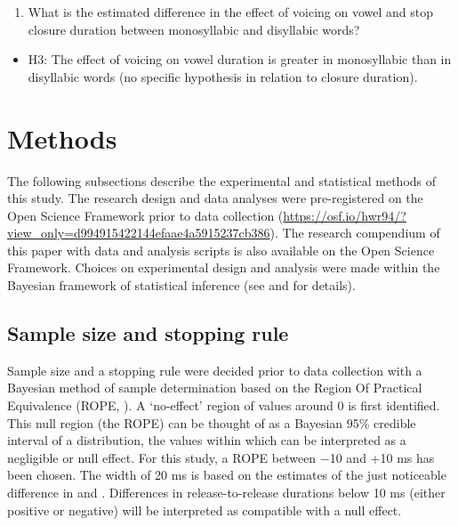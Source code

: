 \documentclass[
  12pt,
  a4paper,
]{article}
\providecommand{\tightlist}{%
  \setlength{\itemsep}{0pt}\setlength{\parskip}{0pt}}
\begin{document}
\begin{enumerate}
\def\labelenumi{\arabic{enumi}.}
\setcounter{enumi}{2}
\tightlist
\item
  What is the estimated difference in the effect of voicing on vowel and
  stop closure duration between monosyllabic and disyllabic words?
\end{enumerate}

\begin{itemize}
\tightlist
\item
  H3: The effect of voicing on vowel duration is greater in monosyllabic
  than in disyllabic words (no specific hypothesis in relation to
  closure duration).
\end{itemize}

\hypertarget{methods}{%
\section{Methods}\label{methods}}

The following subsections describe the experimental and statistical
methods of this study. The research design and data analyses were
pre-registered on the Open Science Framework prior to data collection
(\url{https://osf.io/hwr94/?view_only=d994915422144efaae4a5915237cb386}).
The research compendium of this paper with data and analysis scripts is
also available on the Open Science Framework. Choices on experimental
design and analysis were made within the Bayesian framework of
statistical inference (see  and  for
details).

\hypertarget{sample-size-and-stopping-rule}{%
\subsection{Sample size and stopping
rule}\label{sample-size-and-stopping-rule}}

\label{s:sample-size}

Sample size and a stopping rule were decided prior to data collection
with a Bayesian method of sample determination based on the Region Of
Practical Equivalence (ROPE, \citealt{kruschke2015, vasishth2018a}). A
`no-effect' region of values around 0 is first identified. This null
region (the ROPE) can be thought of as a Bayesian 95\% credible interval
of a distribution, the values within which can be interpreted as a
negligible or null effect. For this study, a ROPE between −10 and +10 ms
has been chosen. The width of 20 ms is based on the estimates of the
just noticeable difference in \citet{huggins1972} and
\citet{nooteboom1980}. Differences in release-to-release durations below
10 ms (either positive or negative) will be interpreted as compatible
with a null effect.
\end{document}
